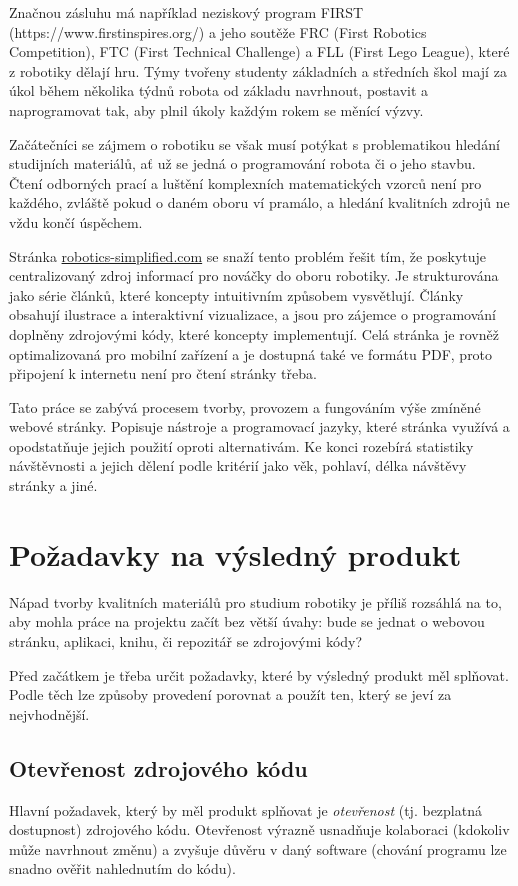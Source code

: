 \documentclass[a4paper, 12pt]{article}
\begin{document}
  Značnou zásluhu má například neziskový program FIRST (https://www.firstinspires.org/) a jeho soutěže FRC (First Robotics Competition), FTC (First Technical Challenge) a FLL (First Lego League), které z robotiky dělají hru. Týmy tvořeny studenty základních a středních škol mají za úkol během několika týdnů robota od základu navrhnout, postavit a naprogramovat tak, aby plnil úkoly každým rokem se měnící výzvy.

  Začátečníci se zájmem o robotiku se však musí potýkat s problematikou hledání studijních materiálů, ať už se jedná o programování robota či o jeho stavbu. Čtení odborných prací a luštění komplexních matematických vzorců není pro každého, zvláště pokud o daném oboru ví pramálo, a hledání kvalitních zdrojů ne vždu končí úspěchem.

  Stránka \url{robotics-simplified.com} se snaží tento problém řešit tím, že poskytuje centralizovaný zdroj informací pro nováčky do oboru robotiky. Je strukturována jako série článků, které koncepty intuitivním způsobem vysvětlují. Články obsahují ilustrace a interaktivní vizualizace, a jsou pro zájemce o programování doplněny zdrojovými kódy, které koncepty implementují. Celá stránka je rovněž optimalizovaná pro mobilní zařízení a je dostupná také ve formátu PDF, proto připojení k internetu není pro čtení stránky třeba.

  Tato práce se zabývá procesem tvorby, provozem a fungováním výše zmíněné webové stránky. Popisuje nástroje a programovací jazyky, které stránka využívá a opodstatňuje jejich použití oproti alternativám. Ke konci rozebírá statistiky návštěvnosti a jejich dělení podle kritérií jako věk, pohlaví, délka návštěvy stránky a jiné.

  \newpage

  \section{Požadavky na výsledný produkt} \label{sec:Požadavky na výsledný produkt}
  Nápad tvorby kvalitních materiálů pro studium robotiky je příliš rozsáhlá na to, aby mohla práce na projektu začít bez větší úvahy: bude se jednat o webovou stránku, aplikaci, knihu, či repozitář se zdrojovými kódy?

  Před začátkem je třeba určit požadavky, které by výsledný produkt měl splňovat. Podle těch lze způsoby provedení porovnat a použít ten, který se jeví za nejvhodnější.


  \subsection{Otevřenost zdrojového kódu}
  Hlavní požadavek, který by měl produkt splňovat je \emph{otevřenost} (tj. bezplatná dostupnost) zdrojového kódu. Otevřenost výrazně usnadňuje kolaboraci (kdokoliv může navrhnout změnu) a zvyšuje důvěru v daný software (chování programu lze snadno ověřit nahlednutím do kódu).
\end{document}
